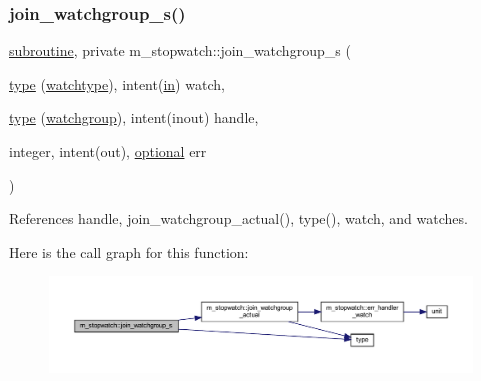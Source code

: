 \subsubsection{\texorpdfstring{join\+\_\+watchgroup\+\_\+s()}{join\_watchgroup\_s()}}
{\footnotesize\ttfamily \hyperlink{M__stopwatch_83_8txt_acfbcff50169d691ff02d4a123ed70482}{subroutine}, private m\+\_\+stopwatch\+::join\+\_\+watchgroup\+\_\+s (\begin{DoxyParamCaption}\item[{\hyperlink{stop__watch_83_8txt_a70f0ead91c32e25323c03265aa302c1c}{type} (\hyperlink{structm__stopwatch_1_1watchtype}{watchtype}), intent(\hyperlink{M__journal_83_8txt_afce72651d1eed785a2132bee863b2f38}{in})}]{watch,  }\item[{\hyperlink{stop__watch_83_8txt_a70f0ead91c32e25323c03265aa302c1c}{type} (\hyperlink{structm__stopwatch_1_1watchgroup}{watchgroup}), intent(inout)}]{handle,  }\item[{integer, intent(out), \hyperlink{option__stopwatch_83_8txt_aa4ece75e7acf58a4843f70fe18c3ade5}{optional}}]{err }\end{DoxyParamCaption})\hspace{0.3cm}{\ttfamily [private]}}



References handle, join\+\_\+watchgroup\+\_\+actual(), type(), watch, and watches.

Here is the call graph for this function\+:
\nopagebreak
\begin{figure}[H]
\begin{center}
\leavevmode
\includegraphics[width=350pt]{namespacem__stopwatch_ab3cc8ca14a1c99895e0dec06d0119cac_cgraph}
\end{center}
\end{figure}
\mbox{\label{namespacem__stopwatch_af63fc0f9b537a76feec75584dfa4c95b}} 
